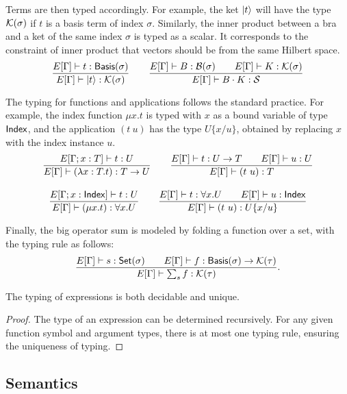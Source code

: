 Terms are then typed accordingly.
For example, the ket \( \ket{t} \) will have the type \( \mathcal{K}(\sigma) \) if \( t \) is a basis term of index \( \sigma \). Similarly, the inner product between a bra and a ket of the same index \( \sigma \) is typed as a scalar. It corresponds to the constraint of inner product that vectors should be from the same Hilbert space.
\begin{gather*}
    \frac{E[\Gamma]\vdash t : \mathsf{Basis}(\sigma)}{E[\Gamma] \vdash \ket{t} : \mathcal{K}(\sigma)}
    \qquad
    \frac{E[\Gamma]\vdash B : \mathcal{B}(\sigma) \qquad E[\Gamma]\vdash K : \mathcal{K}(\sigma)}{E[\Gamma] \vdash B \cdot K : \mathcal{S}}
\end{gather*}

The typing for functions and applications follows the standard practice. For example, the index function \( \mu x. t \) is typed with \( x \) as a bound variable of type \( \mathsf{Index} \), and the application \( (t\ u) \) has the type \( U\{x/u\} \), obtained by replacing \( x \) with the index instance \( u \).
\begin{gather*}
    \frac{E[\Gamma; x : T] \vdash t : U}{E[\Gamma] \vdash (\lambda x : T . t) : T \to U}
    \qquad
    \frac{E[\Gamma] \vdash t:U \to T \qquad E[\Gamma] \vdash u:U}{E[\Gamma] \vdash (t\ u):T} 
    \\[1em]
    \frac{E[\Gamma; x : \mathsf{Index}] \vdash t : U}{E[\Gamma] \vdash (\mu x.t) : \forall x.U}
    \qquad
    \frac{E[\Gamma] \vdash t:\forall x.U \qquad E[\Gamma] \vdash u : \mathsf{Index}}{E[\Gamma] \vdash (t\ u):U\{x/u\}}
\end{gather*}

Finally, the big operator sum is modeled by folding a function over a set, with the typing rule as follows:
\[
    \frac{E[\Gamma] \vdash s : \mathsf{Set}(\sigma) \qquad E[\Gamma] \vdash f : \mathsf{Basis}(\sigma) \to \mathcal{K}(\tau)}{E[\Gamma] \vdash \sum_{s} f : \mathcal{K}(\tau)}.
\]

\begin{lemma}
    The typing of expressions is both decidable and unique.
\end{lemma}

\begin{proof}
    The type of an expression can be determined recursively. For any given function symbol and argument types, there is at most one typing rule, ensuring the uniqueness of typing.
\end{proof}






\subsection{Semantics}

